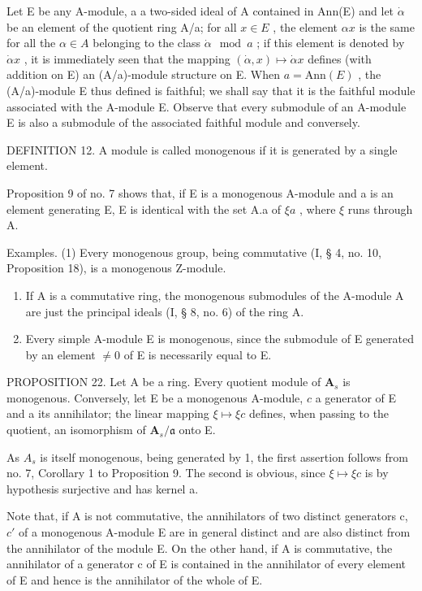 Let E be any A-module, a a two-sided ideal of A contained in Ann(E) and let \(\dot{\alpha}\) be an element of the quotient ring A/a; for all \(x \in E\) , the element \(\alpha x\) is the same for all the \(\alpha \in A\) belonging to the class \(\dot{\alpha} \mod a\) ; if this element is denoted by \(\dot{\alpha}x\) , it is immediately seen that the mapping \((\dot{\alpha}, x) \mapsto \dot{\alpha}x\) defines (with addition on E) an (A/a)-module structure on E. When \(a = \text{Ann}(E)\) , the (A/a)-module E thus defined is faithful; we shall say that it is the faithful module associated with the A-module E. Observe that every submodule of an A-module E is also a submodule of the associated faithful module and conversely.

DEFINITION 12. A module is called monogenous if it is generated by a single element.

Proposition 9 of no. 7 shows that, if E is a monogenous A-module and a is an element generating E, E is identical with the set A.a of \(\xi a\) , where \(\xi\) runs through A.

Examples. (1) Every monogenous group, being commutative (I, § 4, no. 10, Proposition 18), is a monogenous Z-module.

\begin{enumerate}
\def\labelenumi{(\arabic{enumi})}
\setcounter{enumi}{1}
\item
  If A is a commutative ring, the monogenous submodules of the A-module A are just the principal ideals (I, § 8, no. 6) of the ring A.
\item
  Every simple A-module E is monogenous, since the submodule of E generated by an element \(\neq0\) of E is necessarily equal to E.
\end{enumerate}

PROPOSITION 22. Let A be a ring. Every quotient module of \(\mathbf{A}_s\) is monogenous. Conversely, let E be a monogenous A-module, \(c\) a generator of E and a its annihilator; the linear mapping \(\xi \mapsto \xi c\) defines, when passing to the quotient, an isomorphism of \(\mathbf{A}_s / \mathfrak{a}\) onto E.

As \(A_{s}\) is itself monogenous, being generated by 1, the first assertion follows from no. 7, Corollary 1 to Proposition 9. The second is obvious, since \(\xi \mapsto \xi c\) is by hypothesis surjective and has kernel a.

Note that, if A is not commutative, the annihilators of two distinct generators c, \(c'\) of a monogenous A-module E are in general distinct and are also distinct from the annihilator of the module E. On the other hand, if A is commutative, the annihilator of a generator c of E is contained in the annihilator of every element of E and hence is the annihilator of the whole of E.

